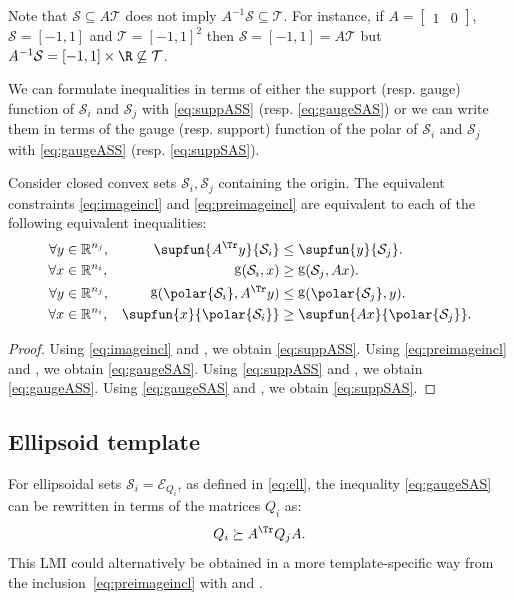 \documentclass[11pt,twoside,a4paper,openright]{uclouvain-thesis}
\DeclareMathOperator{\gauge}{g}
\begin{document}
\begin{myrem}
  \label{rem:image}
  Note that $\mathcal{S} \subseteq A\mathcal{T}$
  does not imply $A^{-1}\mathcal{S} \subseteq \mathcal{T}$.
  For instance, if
  $A = \begin{bmatrix} 1 & 0
  \end{bmatrix}$,
  $\mathcal{S} = [-1, 1]$ and $\mathcal{T} = [-1, 1]^2$ then
  $\mathcal{S} = [-1, 1] = A\mathcal{T}$ but
  $A^{-1}\mathcal{S} = [-1, 1] \times \R \not\subseteq \mathcal{T}$.
\end{myrem}

We can formulate inequalities in terms of either the support (resp. gauge) function of $\mathcal{S}_i$ and $\mathcal{S}_j$
with \eqref{eq:suppASS} (resp. \eqref{eq:gaugeSAS}) or
we can write them in terms of the gauge (resp. support) function of the polar of $\mathcal{S}_i$ and $\mathcal{S}_j$
with \eqref{eq:gaugeASS} (resp. \eqref{eq:suppSAS}).
\begin{mytheo}
  \label{theo:gaugesupp_image}
  Consider closed convex sets $\mathcal{S}_i, \mathcal{S}_j$ containing the origin.
  The equivalent constraints \eqref{eq:imageincl} and \eqref{eq:preimageincl}
  are equivalent to each of the following equivalent inequalities:
  \begin{align}
    \label{eq:suppASS}
    \forall y &\in \mathbb{R}^{n_j}, & \supfun{A^\Tr y}{\mathcal{S}_i} & \le \supfun{y}{\mathcal{S}_j}.\\
    \label{eq:gaugeSAS}
    \forall x &\in \mathbb{R}^{n_i}, & \gauge(\mathcal{S}_i, x) & \ge \gauge(\mathcal{S}_j, A x).\\
    \label{eq:gaugeASS}
    \forall y &\in \mathbb{R}^{n_j}, & \gauge(\polar{\mathcal{S}_i}, A^\Tr y) & \le \gauge(\polar{\mathcal{S}_j}, y).\\
    \label{eq:suppSAS}
    \forall x &\in \mathbb{R}^{n_i}, & \supfun{x}{\polar{\mathcal{S}_i}} & \ge \supfun{A x}{\polar{\mathcal{S}_j}}.
  \end{align}
  \begin{proof}
    Using \eqref{eq:imageincl} and , we obtain \eqref{eq:suppASS}.
    Using \eqref{eq:preimageincl} and , we obtain \eqref{eq:gaugeSAS}.
    Using \eqref{eq:suppASS} and , we obtain \eqref{eq:gaugeASS}.
    Using \eqref{eq:gaugeSAS} and , we obtain \eqref{eq:suppSAS}.
  \end{proof}
\end{mytheo}

\subsection{Ellipsoid template}
For ellipsoidal sets $\mathcal{S}_i = \mathcal{E}_{Q_i}$, as defined in \eqref{eq:ell}, the inequality \eqref{eq:gaugeSAS}
can be rewritten in terms of the matrices $Q_i$ as:
\begin{equation}
  \label{eq:ellprimageincl}
  Q_i \succeq A^\Tr Q_j A.
\end{equation}
This LMI could alternatively be obtained in a more template-specific way from the inclusion~\eqref{eq:preimageincl}
with  and .
\end{document}

